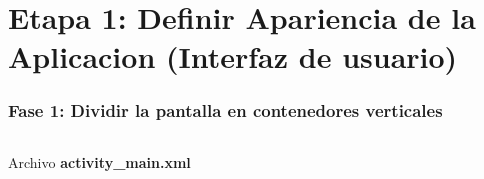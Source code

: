 
\section{Etapa 1: Definir Apariencia de la Aplicacion (Interfaz de usuario) }
\begin{frame}[fragile]
\frametitle{Fase 1: Dividir la pantalla en contenedores verticales} 
\begin{columns}
\begin{block}{Archivo \textbf{activity\_main.xml}}
%
\inputminted[highlightlines={7-11},linenos,fontsize=\tiny]{xml}{00_CambiosInterfaz/Layout_Fase1.xml}


\end{block}
\end{columns}
\end{frame}
